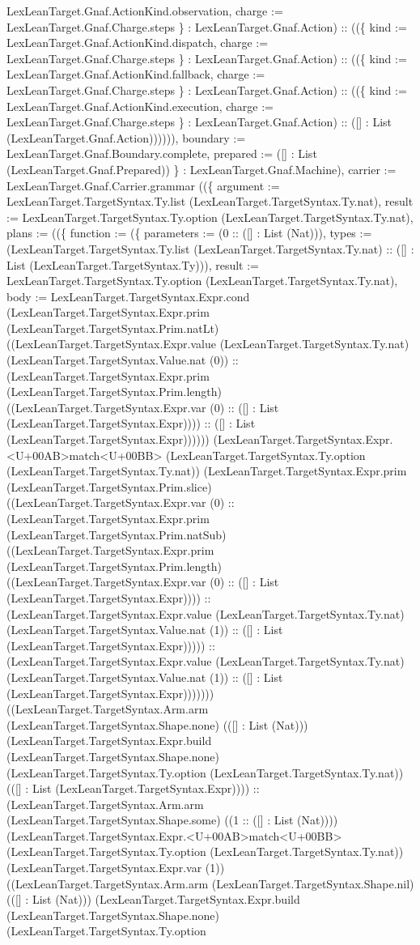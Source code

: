 \documentclass[11pt]{article}
\begin{document}
LexLeanTarget.Gnaf.ActionKind.observation, charge := LexLeanTarget.Gnaf.Charge.steps \} : LexLeanTarget.Gnaf.Action) :: ((\{ kind := LexLeanTarget.Gnaf.ActionKind.dispatch, charge := LexLeanTarget.Gnaf.Charge.steps \} : LexLeanTarget.Gnaf.Action) :: ((\{ kind := LexLeanTarget.Gnaf.ActionKind.fallback, charge := LexLeanTarget.Gnaf.Charge.steps \} : LexLeanTarget.Gnaf.Action) :: ((\{ kind := LexLeanTarget.Gnaf.ActionKind.execution, charge := LexLeanTarget.Gnaf.Charge.steps \} : LexLeanTarget.Gnaf.Action) :: ([] : List (LexLeanTarget.Gnaf.Action)))))), boundary := LexLeanTarget.Gnaf.Boundary.complete, prepared := ([] : List (LexLeanTarget.Gnaf.Prepared)) \} : LexLeanTarget.Gnaf.Machine), carrier := LexLeanTarget.Gnaf.Carrier.grammar ((\{ argument := LexLeanTarget.TargetSyntax.Ty.list (LexLeanTarget.TargetSyntax.Ty.nat), result := LexLeanTarget.TargetSyntax.Ty.option (LexLeanTarget.TargetSyntax.Ty.nat), plans := ((\{ function := (\{ parameters := (0 :: ([] : List (Nat))), types := (LexLeanTarget.TargetSyntax.Ty.list (LexLeanTarget.TargetSyntax.Ty.nat) :: ([] : List (LexLeanTarget.TargetSyntax.Ty))), result := LexLeanTarget.TargetSyntax.Ty.option (LexLeanTarget.TargetSyntax.Ty.nat), body := LexLeanTarget.TargetSyntax.Expr.cond (LexLeanTarget.TargetSyntax.Expr.prim (LexLeanTarget.TargetSyntax.Prim.natLt) ((LexLeanTarget.TargetSyntax.Expr.value (LexLeanTarget.TargetSyntax.Ty.nat) (LexLeanTarget.TargetSyntax.Value.nat (0)) :: (LexLeanTarget.TargetSyntax.Expr.prim (LexLeanTarget.TargetSyntax.Prim.length) ((LexLeanTarget.TargetSyntax.Expr.var (0) :: ([] : List (LexLeanTarget.TargetSyntax.Expr)))) :: ([] : List (LexLeanTarget.TargetSyntax.Expr)))))) (LexLeanTarget.TargetSyntax.Expr.<U+00AB>match<U+00BB> (LexLeanTarget.TargetSyntax.Ty.option (LexLeanTarget.TargetSyntax.Ty.nat)) (LexLeanTarget.TargetSyntax.Expr.prim (LexLeanTarget.TargetSyntax.Prim.slice) ((LexLeanTarget.TargetSyntax.Expr.var (0) :: (LexLeanTarget.TargetSyntax.Expr.prim (LexLeanTarget.TargetSyntax.Prim.natSub) ((LexLeanTarget.TargetSyntax.Expr.prim (LexLeanTarget.TargetSyntax.Prim.length) ((LexLeanTarget.TargetSyntax.Expr.var (0) :: ([] : List (LexLeanTarget.TargetSyntax.Expr)))) :: (LexLeanTarget.TargetSyntax.Expr.value (LexLeanTarget.TargetSyntax.Ty.nat) (LexLeanTarget.TargetSyntax.Value.nat (1)) :: ([] : List (LexLeanTarget.TargetSyntax.Expr))))) :: (LexLeanTarget.TargetSyntax.Expr.value (LexLeanTarget.TargetSyntax.Ty.nat) (LexLeanTarget.TargetSyntax.Value.nat (1)) :: ([] : List (LexLeanTarget.TargetSyntax.Expr))))))) ((LexLeanTarget.TargetSyntax.Arm.arm (LexLeanTarget.TargetSyntax.Shape.none) (([] : List (Nat))) (LexLeanTarget.TargetSyntax.Expr.build (LexLeanTarget.TargetSyntax.Shape.none) (LexLeanTarget.TargetSyntax.Ty.option (LexLeanTarget.TargetSyntax.Ty.nat)) (([] : List (LexLeanTarget.TargetSyntax.Expr)))) :: (LexLeanTarget.TargetSyntax.Arm.arm (LexLeanTarget.TargetSyntax.Shape.some) ((1 :: ([] : List (Nat)))) (LexLeanTarget.TargetSyntax.Expr.<U+00AB>match<U+00BB> (LexLeanTarget.TargetSyntax.Ty.option (LexLeanTarget.TargetSyntax.Ty.nat)) (LexLeanTarget.TargetSyntax.Expr.var (1)) ((LexLeanTarget.TargetSyntax.Arm.arm (LexLeanTarget.TargetSyntax.Shape.nil) (([] : List (Nat))) (LexLeanTarget.TargetSyntax.Expr.build (LexLeanTarget.TargetSyntax.Shape.none) (LexLeanTarget.TargetSyntax.Ty.option 
\end{document}
